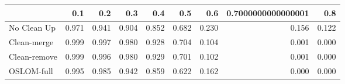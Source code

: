 \begin{tabular}{lrrrrrrrr}
\toprule
{} &   0.1 &   0.2 &   0.3 &   0.4 &   0.5 &   0.6 & 0.7000000000000001 &   0.8 \\
\midrule
No Clean Up  & 0.971 & 0.941 & 0.904 & 0.852 & 0.682 & 0.230 &              0.156 & 0.122 \\
Clean-merge  & 0.999 & 0.997 & 0.980 & 0.928 & 0.704 & 0.104 &              0.001 & 0.000 \\
Clean-remove & 0.999 & 0.996 & 0.980 & 0.929 & 0.701 & 0.102 &              0.001 & 0.000 \\
OSLOM-full   & 0.995 & 0.985 & 0.942 & 0.859 & 0.622 & 0.162 &              0.000 & 0.000 \\
\bottomrule
\end{tabular}
